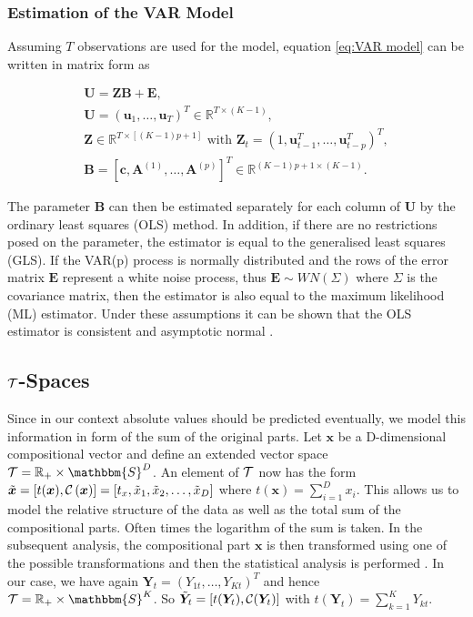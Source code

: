 \subsubsection{Estimation of the VAR Model}
\label{sec: Estimation of the Var Model}


Assuming $T$ observations are used for the model, equation \ref{eq:VAR model} can be written in matrix form as

\begin{gather*}
\textbf{U} = \textbf{ZB} + \textbf{E}, \\
\textbf{U} = (\textbf{u}_1,\ldots,\textbf{u}_T)^T \in \mathbb{R}^{T \times (K-1)}, \\
\textbf{Z} \in \mathbb{R}^{T \times \left[(K-1)p+1\right]} \text{ with } \textbf{Z}_t = \left(1,\textbf{u}_{t-1}^T,\ldots,\textbf{u}_{t-p}^T\right)^T, \\ %
\textbf{B} = \left[\textbf{c},\textbf{A}^{(1)}, \ldots, \textbf{A}^{(p)}\right]^T \in \mathbb{R}^{(K-1)p +1 \times (K-1)}.
\label{eq:VAR model matrix}
\end{gather*}


The parameter $\textbf{B}$ can then be estimated separately for each column of $\textbf{U}$ by the ordinary least squares (OLS) method. In addition, if there are no restrictions posed on the parameter, the estimator is equal to the generalised least squares (GLS). If the VAR(p) process is normally distributed and the rows of the error matrix $\textbf{E}$ represent a white noise process, thus $\bm{E} \sim WN(\Sigma)$ where $\Sigma$ is the covariance matrix, then the estimator is also equal to the maximum likelihood (ML) estimator. 
Under these assumptions it can be shown that the OLS estimator is consistent and asymptotic normal \cite{Kynclova:2015} \cite{Luetkepohl:2007}. 


\subsection{$\mathcal{T}$-Spaces}
\label{sec: Tspaces}

Since in our context absolute values should be predicted eventually, we model this information in form of the sum of the original parts. Let $\textbf{x}$ be a D-dimensional compositional vector and define an extended vector space $\Tsp = \mathbb{R}_+ \times \mathbbm{S}^D$.  An element of $\mathcal{T}$ now has the form $\tilde{\bm{x}} = \left[t(\bm{x}),\mathcal{C}\left({\bm{x}}\right)\right] = \left[t_x,\tilde{x}_1,\tilde{x}_2,\ldots,\tilde{x}_D \right]$ where $t(\bm{x})= \sum_{i=1}^D x_i$. This allows us to model the relative structure of the data as well as the total sum of the compositional parts. Often times the logarithm of the sum is taken. In the subsequent analysis, the compositional part $\bm{x}$ is then transformed using one of the possible transformations and then the statistical analysis is performed \cite{Kynclova:2015}. In our case, we have again $\bm{Y}_t=(Y_{1t},\ldots,Y_{Kt})^T$ and hence $\Tsp = \mathbb{R}_+ \times \mathbbm{S}^K$. So $\tilde{\bm{Y}}_t=[t(\bm{Y}_t),\mathcal{C}(\bm{Y}_t)]$ with $t(\bm{Y}_t)=\sum_{k=1}^K Y_{kt}$. 


